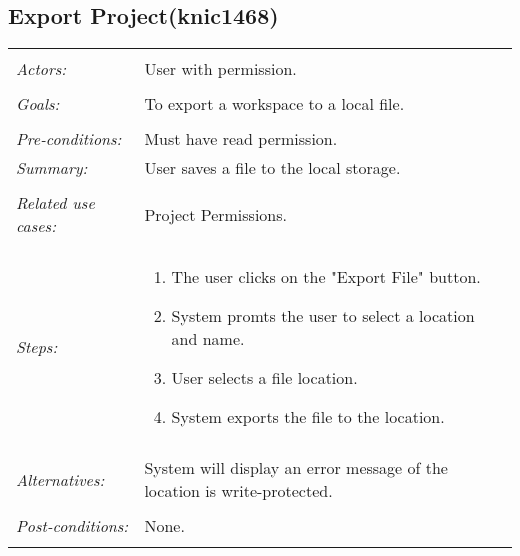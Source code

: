 \subsection{Export Project(knic1468)}
\begin{tabular}{ p{2cm} p{12cm} }
\hline
\\
\textit{Actors:} & User with permission.\\
\\
\textit{Goals:} & To export a workspace to a local file. \\
\\
\textit{Pre-conditions:} & Must have read permission. 
\\
\textit{Summary:} & User saves a file to the local storage. \\
\\
\textit{Related use cases:} & Project Permissions. \\
\\
\textit{Steps:} & \begin{enumerate}
 \item The user clicks on the "Export File" button. 
 \item System promts the user to select a location and name. 
 \item User selects a file location. 
 \item System exports the file to the location. 
 \end{enumerate}\\
 \\
 \textit{Alternatives:} & System will display an error message of the location is write-protected.\\
 \\
 \textit{Post-conditions:} & None. \\
 \\
\hline
\end{tabular}

